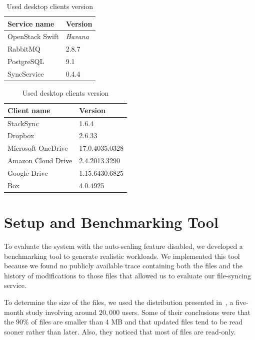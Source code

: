 \begin{table}[!htb]
    \begin{minipage}{.5\linewidth}
      \centering
        \begin{tabular}{ | l | l | }
    	\hline
    	Service name & Version \\ \hline
    	OpenStack Swift & \textit{Havana} \\
    	RabbitMQ & 2.8.7 \\
    	PostgreSQL & 9.1 \\
    	SyncService & 0.4.4 \\ \hline
    	\end{tabular}
    \caption{Used services version}
    \label{table:services}
    \end{minipage}%
    \begin{minipage}{.5\linewidth}
      \centering
        \begin{tabular}{ | l | l | }
    	\hline
    	Client name & Version \\ \hline
    	StackSync & 1.6.4 \\
    	Dropbox & 2.6.33 \\
    	Microsoft OneDrive & 17.0.4035.0328 \\
    	Amazon Cloud Drive & 2.4.2013.3290 \\ 
    	Google Drive & 1.15.6430.6825 \\ 
    	Box & 4.0.4925 \\ \hline
    	\end{tabular}
    \caption{Used desktop clients version}
    \label{table:clients}
    \end{minipage} 
\end{table}

\section{Setup and Benchmarking Tool}

To evaluate the system with the auto-scaling feature disabled, we developed a benchmarking tool to generate
realistic workloads. We implemented this tool because we found no publicly available trace containing both 
the files and the history of modifications to those files that allowed us to evaluate our file-syncing service.

To determine the size of the files, we used the distribution presented in~\cite{liu2013},
a five-month study involving around $20,000$ users. Some of their conclusions
were that the $90\%$ of files are smaller than $4$ MB and that updated files tend to be read sooner
rather than later. Also, they noticed that most of files are read-only.

